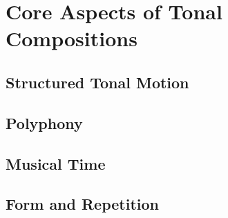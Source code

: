 \chapter{Core Aspects of Tonal Compositions}
    \section{Structured Tonal Motion}
    \section{Polyphony}
    \section{Musical Time}
    \section{Form and Repetition}